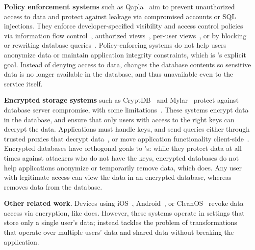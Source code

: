 \textbf{Policy enforcement systems} such as Qapla~\cite{qapla} aim to prevent
unauthorized access to data and protect against leakage via compromised
accounts or SQL injections. They enforce developer-specified
visibility and access control policies via information flow
control~\cite{static, jeeves, jif, hails, ifdb}, authorized views~\cite{oracle},
per-user views~\cite{multiverse}, or by blocking or rewriting database
queries~\cite{blockaid, qapla, sieve}.
%
Policy-enforcing systems do not help users anonymize data or maintain
application integrity constraints, which is \sys's explicit
goal.
%
Instead of denying access to data, \sys changes the database contents so sensitive
data is no longer available in the database, and thus unavailable even to the
service itself.
%

\textbf{Encrypted storage systems} such as CryptDB~\cite{cryptdb} and
Mylar~\cite{mylar} protect against database server compromise, with some
limitations~\cite{grubbs}.
%
These systems encrypt data in the database, and
ensure that only users with access to the right keys can decrypt the data.
%
Applications must handle keys, and send queries
either through trusted proxies that decrypt data~\cite{cryptdb}, or move
application functionality client-side~\cite{mylar}.
%
Encrypted databases have orthogonal goals to \sys's: while they protect data at all times
against attackers who do not have the keys, encrypted databases do not help applications
anonymize or temporarily remove data, which \sys does.
%
Any user with legitimate access can view the data in an encrypted database,
whereas \sys removes \xxed data from the database.


%

\textbf{Other related work}.
%
%
{Devices} using iOS~\cite{applesecurity},
Android~\cite{applesecurity}, or CleanOS~\cite{cleanos} revoke
data access via encryption, like \sys does.
%
However, these systems operate in settings that store only a single user's data;
\sys instead tackles the problem of
transformations that operate over multiple users' data and shared data without
breaking the application.
%

